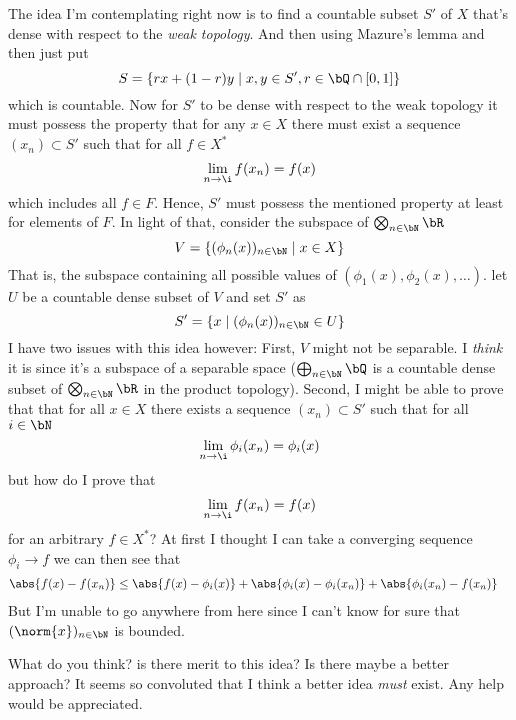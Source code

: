\documentclass{pset}
\begin{document}
The idea I'm contemplating right now is to find a countable subset $S'$ of $X$ that's dense with respect to the \emph{weak topology}. And then using Mazure's lemma and then just put 
\[S=\{rx+(1-r)y \mid x,y\in S', r\in \bQ \cap [0, 1]\}\]
 which is countable. Now for $S'$ to be dense with respect to the weak topology it must possess the property that for any $x\in X$ there must exist a sequence $(x_n)\subset S'$ such that for all $f\in X^*$
\[\lim_{n\to\i} f(x_n) = f(x)\]
which includes all $f\in F$. Hence, $S'$ must possess the mentioned property at least for elements of $F$. In light of that, consider the subspace of $\bigotimes_{n\in\bN} \bR$
\[V=\{(\phi_n(x))_{n\in\bN} \mid x\in X\}\]
That is, the subspace containing all possible values of $(\phi_1(x), \phi_2(x), \dots)$. let $U$ be a countable dense subset of $V$ and set $S'$ as
\[S'=\{x \mid (\phi_n(x))_{n\in\bN}\in U\}\]
I have two issues with this idea however: First, $V$ might not be separable. I \emph{think} it is since it's a subspace of a separable space ($\bigoplus_{n\in\bN} \bQ$ is a countable dense subset of $\bigotimes_{n\in\bN} \bR$ in the product topology). Second, I might be able to prove that that for all $x \in X$ there exists a sequence $(x_n)\subset S'$ such that for all $i\in\bN$
\[\lim_{n\to\i} \phi_i(x_n) = \phi_i(x)\]
but how do I prove that
\[\lim_{n\to\i} f(x_n) = f(x)\]
for an arbitrary $f\in X^*$? At first I thought I can take a converging sequence $\phi_i \to f$ we can then see that 
\begin{align*}
    \abs{f(x)-f(x_n)} &\leq \abs{f(x)-\phi_i(x)} + \abs{\phi_i(x)-\phi_i(x_n)}+\abs{\phi_i(x_n)-f(x_n)} 
\end{align*}
But I'm unable to go anywhere from here since I can't know for sure that $(\norm{x})_{n\in\bN}$ is bounded.

What do you think? is there merit to this idea? Is there maybe a better approach? It seems so convoluted that I think a better idea \emph{must} exist. Any help would be appreciated.

\pagebreak
\end{document}
